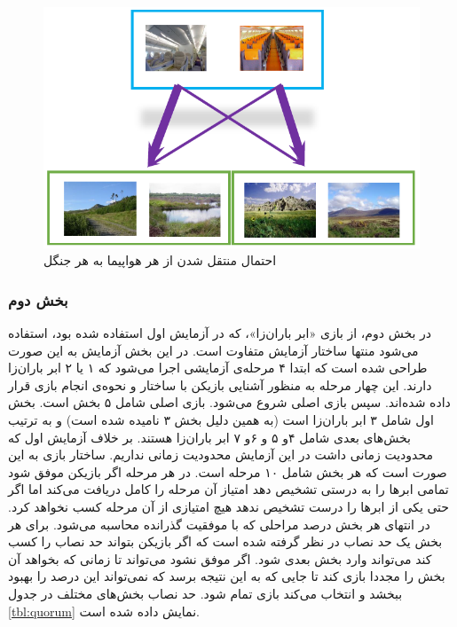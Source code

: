 \documentclass[twoside, a4paper,11pt]{book}
\numberwithin{equation}{chapter}
\numberwithin{table}{chapter}
\numberwithin{figure}{chapter}
\numberwithin{equation}{chapter}
\begin{document}
\begin{figure}
\centering
\includegraphics[scale=0.8]{Figures/plainJungleProb.png}
\caption{\label{fig:plainJungleProb}
احتمال منتقل شدن از هر هواپیما به هر جنگل
}
\end{figure}

\subsubsection{بخش دوم}

در بخش دوم، از بازی «ابر باران‌زا»، که در آزمایش اول استفاده شده بود، استفاده می‌شود منتها ساختار آزمایش متفاوت است. در این بخش آزمایش به این صورت طراحی شده است که ابتدا ۴ مرحله‌ی آزمایشی اجرا می‌شود که ۱ یا ۲ ابر باران‌زا دارند. این چهار مرحله به منظور آشنایی بازیکن با ساختار و نحوه‌ی انجام بازی قرار داده شده‌اند. سپس بازی اصلی شروع می‌شود. بازی اصلی شامل ۵ بخش است. بخش اول شامل ۳ ابر باران‌زا است (به همین دلیل بخش ۳ نامیده شده است) و به ترتیب بخش‌های بعدی شامل ۴و ۵ و ۶و ۷ ابر باران‌زا هستند. بر خلاف آزمایش اول که محدودیت زمانی داشت در این آزمایش محدودیت زمانی نداریم. ساختار بازی به این صورت است که هر بخش شامل ۱۰ مرحله است. در هر مرحله اگر بازیکن موفق شود تمامی ابرها را به درستی تشخیص دهد امتیاز آن مرحله را کامل دریافت می‌کند اما اگر حتی یکی از ابرها را درست تشخیص ندهد هیچ امتیازی از آن مرحله کسب نخواهد کرد. در انتهای هر بخش درصد مراحلی که با موفقیت گذرانده محاسبه می‌شود. برای هر بخش یک حد نصاب در نظر گرفته شده است که اگر بازیکن بتواند حد نصاب را کسب کند می‌تواند وارد بخش بعدی شود. اگر موفق نشود می‌تواند تا زمانی که بخواهد آن بخش را مجددا بازی کند تا جایی که به این نتیجه برسد که نمی‌تواند این درصد را بهبود ببخشد و انتخاب می‌کند بازی تمام شود. حد نصاب بخش‌های مختلف در جدول \ref{tbl:quorum} نمایش داده شده است. 
\end{document}
